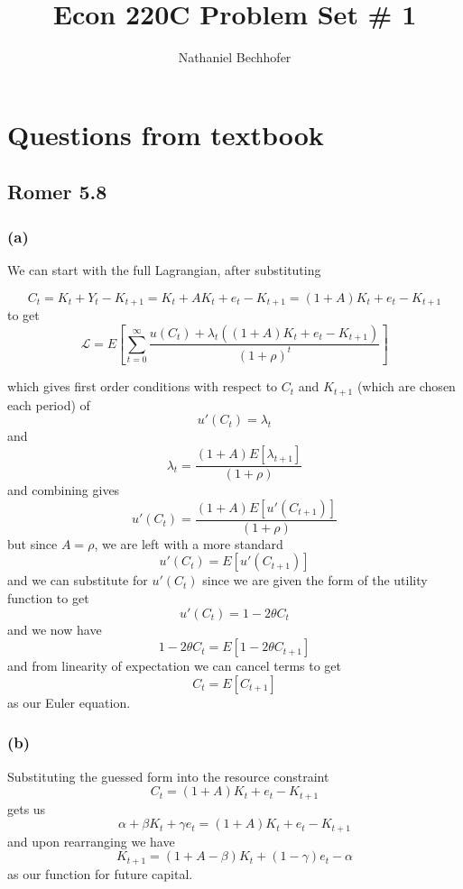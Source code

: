 \documentclass[11pt]{amsart}
\title{Econ 220C Problem Set \# 1}
\author{Nathaniel Bechhofer}
\begin{document}
	


	
\maketitle

\section{Questions from textbook}

\subsection{Romer 5.8}

\subsubsection*{(a)}

We can start with the full Lagrangian, after substituting

\[
C_t = K_t + Y_t - K_{t+1} =  K_t + A K_t + e_t - K_{t+1}  = (1 + A) K_t + e_t - K_{t+1}
\]
to get
\[
\mathcal{L} = E \left[ \sum_{t=0}^{\infty} \frac{u(C_t) + \lambda_t ((1 + A) K_t + e_t - K_{t+1})}{(1+\rho)^t} \right]
\]

which gives first order conditions with respect to $C_t$ and $K_{t+1}$ (which are chosen each period) of 
\[
u'(C_t) = \lambda_t
\]
and
\[
\lambda_t = \frac{(1+A) E[\lambda_{t+1}]}{(1+\rho)}
\]
and combining gives
\[
u'(C_t) = \frac{(1+A) E[u'(C_{t+1})]}{(1+\rho)}
\]
but since $A=\rho$, we are left with a more standard
\[
u'(C_t) = E[u'(C_{t+1})]
\]
and we can substitute for $u'(C_t)$ since we are given the form of the utility function to get 
\[
u'(C_t) = 1 - 2 \theta C_t
\]
and we now have 
\[
1 - 2 \theta C_t = E[1 - 2 \theta C_{t+1}]
\] 
and from linearity of expectation we can cancel terms to get
\[
C_t = E[C_{t+1}]
\]
as our Euler equation.

\subsubsection*{(b)}

Substituting the guessed form into the resource constraint
\[
C_t = (1 + A) K_t + e_t - K_{t+1}
\]
gets us
\[
\alpha + \beta K_t + \gamma e_t = (1 + A) K_t + e_t - K_{t+1}
\]
and upon rearranging we have
\[
K_{t+1} = (1 + A - \beta) K_t + (1-\gamma) e_t - \alpha
\]
as our function for future capital.
\end{document}
